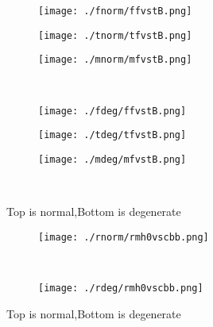 \documentclass[aps,floats,floatfix,nofootinbib]{revtex4-1}
\begin{document}
\begin{center}
\begin{figure}
\begin{subfigure}{0.3\textwidth}
\texttt{[image: ./fnorm/ffvstB.png]}
\label{}
\end{subfigure}
\begin{subfigure}{0.3\textwidth}
\texttt{[image: ./tnorm/tfvstB.png]}
\label{}
\end{subfigure}
\begin{subfigure}{0.3\textwidth}
\texttt{[image: ./mnorm/mfvstB.png]}
\label{}
\end{subfigure}\\
\begin{subfigure}{0.3\textwidth}
\texttt{[image: ./fdeg/ffvstB.png]}
\label{}
\end{subfigure}
\begin{subfigure}{0.3\textwidth}
\texttt{[image: ./tdeg/tfvstB.png]}
\label{}
\end{subfigure}
\begin{subfigure}{0.3\textwidth}
\texttt{[image: ./mdeg/mfvstB.png]}
\label{}
\end{subfigure}\\
\caption{Top is normal,Bottom is degenerate}
\end{figure}
\end{center}

\begin{center}
\begin{figure}
\begin{subfigure}{0.95\textwidth}
\texttt{[image: ./rnorm/rmh0vscbb.png]}
\label{}
\end{subfigure}\\
\begin{subfigure}{0.95\textwidth}
\texttt{[image: ./rdeg/rmh0vscbb.png]}
\label{}
\end{subfigure}
\caption{Top is normal,Bottom is degenerate}
\end{figure}
\end{center}
\end{document}
